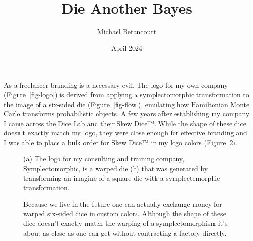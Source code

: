 \documentclass[
  letterpaper,
  DIV=11,
  numbers=noendperiod]{scrartcl}
\title{Die Another Bayes}
\author{Michael Betancourt}
\date{April 2024}
\renewcommand*\contentsname{Table of contents}
\newcommand\contentsname{Table of contents}
\begin{document}
\maketitle

\renewcommand*\contentsname{Table of contents}
{
\hypersetup{linkcolor=}
\setcounter{tocdepth}{3}
\tableofcontents
}
As a freelancer branding is a necessary evil. The logo for my own
company (Figure~\ref{fig-logo}) is derived from applying a
symplectomorphic transformation to the image of a six-sided die
(Figure~\ref{fig-flow}), emulating how Hamiltonian Monte Carlo
transforms probabilistic objects. A few years after establishing my
company I came across the
\href{https://www.mathartfun.com/thedicelab.com/}{Dice Lab} and their
Skew Dice™. While the shape of these dice doesn't exactly match my logo,
they were close enough for effective branding and I was able to place a
bulk order for Skew Dice™ in my logo colors
(Figure~\ref{fig-warped-dice}).

\begin{figure}

\begin{minipage}{0.34\linewidth}


\subcaption{\label{fig-logo}}

\end{minipage}%
%
\begin{minipage}{0.66\linewidth}


\subcaption{\label{fig-flow}}

\end{minipage}%

\caption{\label{fig-logo-motivation}(a) The logo for my consulting and
training company, Symplectomorphic, is a warped die (b) that was
generated by transforming an imagine of a square die with a
symplectomorphic transformation.}

\end{figure}%

\begin{figure}


\caption{\label{fig-warped-dice}Because we live in the future one can
actually exchange money for warped six-sided dice in custom colors.
Although the shape of these dice doesn't exactly match the warping of a
symplectomorphism it's about as close as one can get without contracting
a factory directly.}

\end{figure}%
\end{document}

